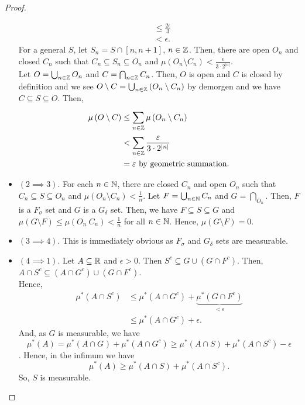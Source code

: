\begin{proof}
\begin{itemize}
\begin{align*}
							&\le \frac{2\epsilon}{3} \\
							&< \epsilon
		.\end{align*}
		For a general \(S\), let \(S_{n} = S \cap \left[ n, n + 1 \right] \), \( n \in \mathbb{Z}\). Then, there are open \(O_{n}\) and closed \(C_{n}\) such that \(C_{n} \subseteq S_{n} \subseteq O_{n}\) and \( \mu\left( O_{n} \setminus C_{n} \right)  < \frac{\epsilon}{3\cdot 2^{\left| n \right| }}\).\\
		Let \(O = \bigcup_{n \in \mathbb{Z}} O_{n}\) and \(C = \bigcap_{n \in \mathbb{Z}}C_{n} \). Then, \(O\) is open and \(C\) is closed by definition and we see \(O \setminus C = \bigcup_{n \in \mathbb{Z}} \left( O_{n} \setminus C_{n} \right) \) by demorgen and we have \(C \subseteq S \subseteq O\). Then,
		\begin{align*}
			\mu\left( O \setminus C \right) &\le \sum_{n \in \mathbb{Z}}^{} \mu\left( O_{n} \setminus C_{n} \right) \\
							&< \sum_{ n \in \mathbb{Z}}^{} \frac{\varepsilon}{3 \cdot 2^{\left| n \right| }} \\
							&=  \varepsilon \text{ by geometric summation}
		.\end{align*}
	\item \(\left( 2 \implies 3 \right) \). For each \(n \in \mathbb{N}\), there are closed \(C_{n}\) and open \(O_{n}\) such that \(C_{n} \subseteq S \subseteq O_{n}\) and \( \mu\left( O_{n} \setminus C_{n} \right)  < \frac{1}{n}\). Let \(F = \bigcup_{n \in \mathbb{N}} C_{n}\) and \(G = \bigcap_{ O_{n}} \). Then, \(F\) is a \(F_{\sigma}\) set and \(G\) is a \(G_{\delta}\) set. Then, we have \(F \subseteq S \subseteq G\) and \( \mu\left( G \setminus F \right) \le \mu\left( O_{n} \ C_{n} \right)  < \frac{1}{n}\) for all \(n \in \mathbb{N}\). Hence, \( \mu \left( G \setminus F \right) = 0 \).
	\item \((3 \implies 4)\). This is immediately obvious as \(F_{\sigma}\) and \(G_{\delta}\) sets are measurable.
	\item \(\left( 4 \implies 1 \right) \). Let \(A \subseteq \mathbb{R}\) and \(\epsilon > 0\). Then \(S^{c} \subseteq G \cup \left( G \cap F^{c} \right) \). Then, \(A \cap S^{c} \subseteq \left( A \cap G^{c} \right) \cup \left( G \cap F^{c} \right) \).\\
		Hence, \begin{align*} \mu^{*}\left( A \cap S^{c} \right) &\le \mu^{*}\left( A \cap G^{c} \right) + \underbrace{ \mu^{*}\left(G \cap F^{c}\right)}_{ < \epsilon} \\
			&\le \mu^{*}\left( A \cap G^{c} \right)  + \epsilon
		.\end{align*}
		And, as \(G\) is measurable, we have \[ \mu^{*}\left( A  \right) =  \mu^{*}\left( A \cap G^{} \right)  + \mu^{*}\left( A \cap G^{c} \right)  \ge  \mu^{*}\left( A \cap S \right)  + \mu ^{*}\left( A \cap S^{c} \right)  - \epsilon\]. Hence, in the infimum we have \[
			\mu^{*}\left( A \right) \ge \mu^{*}\left( A \cap S \right)  + \mu^{*}\left( A \cap S^{c} \right)
		.\]
		So, \(S\) is measurable.
	\end{itemize}
\end{proof}
